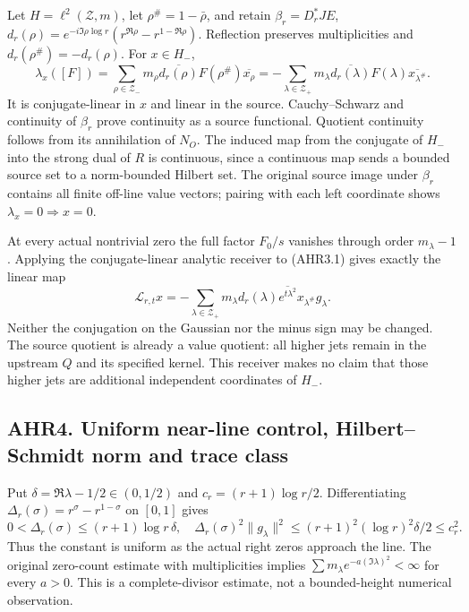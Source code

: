 Let \(H=\ell^2(\mathscr Z,m)\), let \(\rho^\#=1-\bar\rho\), and retain
\(\beta_r=D_r^*JE\),
\(d_r(\rho)=e^{-i\Im\rho\log r}(r^{\Re\rho}-r^{1-\Re\rho})\). Reflection
preserves multiplicities and \(d_r(\rho^\#)=-d_r(\rho)\). For
\(x\in H_-\), \[
\lambda_x([F])=\sum_{\rho\in\mathscr Z_-}m_\rho
\overline{d_r(\rho)}F(\rho^\#)\overline{x_\rho}
=-\sum_{\lambda\in\mathscr Z_+}m_\lambda
\overline{d_r(\lambda)}F(\lambda)\overline{x_{\lambda^\#}}.
\tag{AHR3.1}
\] It is conjugate-linear in \(x\) and linear in the source.
Cauchy--Schwarz and continuity of \(\beta_r\) prove continuity as a
source functional. Quotient continuity follows from its annihilation of
\(N_O\). The induced map from the conjugate of \(H_-\) into the strong
dual of \(R\) is continuous, since a continuous map sends a bounded
source set to a norm-bounded Hilbert set. The original source image
under \(\beta_r\) contains all finite off-line value vectors; pairing
with each left coordinate shows \(\lambda_x=0\Rightarrow x=0\).

At every actual nontrivial zero the full factor \(F_0/s\) vanishes
through order \(m_\lambda-1\). Applying the conjugate-linear analytic
receiver to (AHR3.1) gives exactly the linear map \[
\mathcal L_{r,t}x=-\sum_{\lambda\in\mathscr Z_+}
m_\lambda d_r(\lambda)\overline{e^{t\lambda^2}}x_{\lambda^\#}g_\lambda.
\tag{AHR3.2}
\] Neither the conjugation on the Gaussian nor the minus sign may be
changed. The source quotient is already a value quotient: all higher
jets remain in the upstream \(Q\) and its specified kernel. This
receiver makes no claim that those higher jets are additional
independent coordinates of \(H_-\).

\subsection{AHR4. Uniform near-line control, Hilbert--Schmidt norm and
trace
class}\label{ahr4.-uniform-near-line-control-hilbertschmidt-norm-and-trace-class}

Put \(\delta=\Re\lambda-1/2\in(0,1/2)\) and \(c_r=(r+1)\log r/2\).
Differentiating \(\Delta_r(\sigma)=r^\sigma-r^{1-\sigma}\) on \([0,1]\)
gives \[
0<\Delta_r(\sigma)\le(r+1)\log r\,\delta,
\quad\Delta_r(\sigma)^2\|g_\lambda\|^2
\le(r+1)^2(\log r)^2\delta/2\le c_r^2.
\tag{AHR4.1}
\] Thus the constant is uniform as the actual right zeros approach the
line. The original zero-count estimate with multiplicities implies
\(\sum m_\lambda e^{-a(\Im\lambda)^2}<\infty\) for every \(a>0\). This
is a complete-divisor estimate, not a bounded-height numerical
observation.

